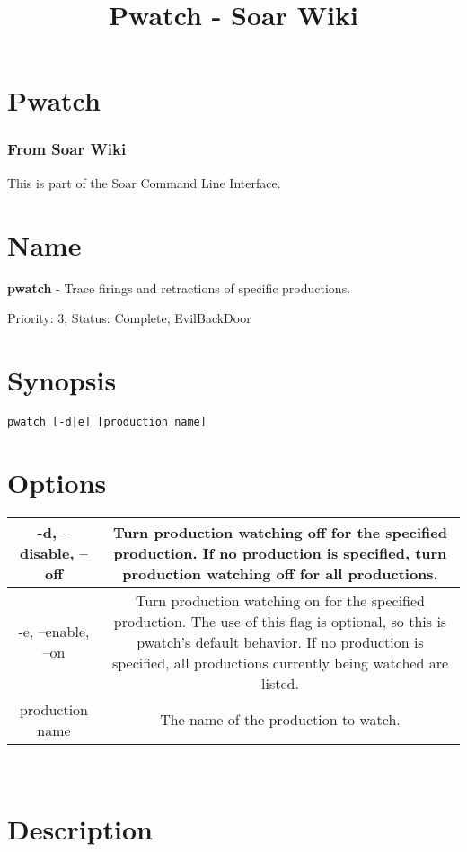 \documentclass[10pt]{article}
\title{Pwatch - Soar Wiki}
\begin{document}
\section*{Pwatch}
\subsubsection*{From Soar Wiki}


 This is part of the Soar Command Line Interface. 
\section*{ Name }


 \textbf{pwatch}
 - Trace firings and retractions of specific productions. 


 Priority: 3; Status: Complete, EvilBackDoor
\section*{ Synopsis }
\begin{verbatim}
pwatch [-d|e] [production name]

\end{verbatim}
\section*{ Options }


\begin{tabular}{|c|c|}
\hline 
 -d, --disable, --off  & Turn production watching off for the specified production. If no production is specified, turn production watching off for all productions.  \\
 \hline 
 -e, --enable, --on  & Turn production watching on for the specified production. The use of this flag is optional, so this is pwatch's default behavior. If no production is specified, all productions currently being watched are listed.  \\
 \hline 
production name & The name of the production to watch.  \\
 \hline 

\end{tabular}



 \\ 

\section*{ Description }
\end{document}

